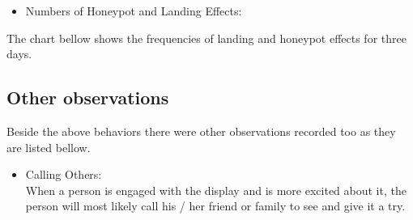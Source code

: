 \begin{itemize}

\item Numbers of Honeypot and Landing Effects: \\

\end{itemize}

The chart bellow shows the frequencies of landing and honeypot effects for three days. 


\begin{minipage}{\textwidth}
\begin{flushleft} 
\begin{table}[H]
\label{tab:landingandhonypot}
\end{table}
\end{flushleft} 
\end{minipage}


\subsection{Other observations}
Beside the above behaviors there were other observations recorded too as they are listed bellow. 
\begin{itemize}

\item Calling Others: \\
When a person is engaged with the display and is more excited about it, the person will most likely call his / her friend or family to see and give it a try. 
\end{itemize}

